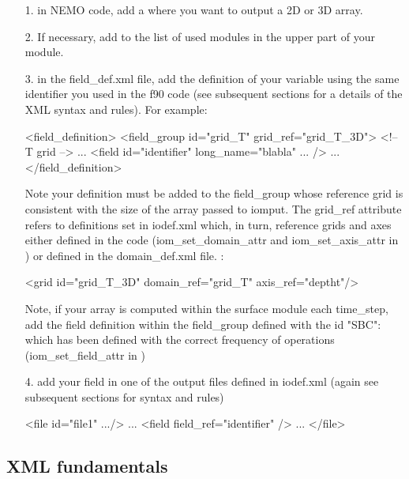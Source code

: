 \documentclass[../main/NEMO_manual]{subfiles}
\begin{document}
\begin{enumerate}
\item[1.]
  in NEMO code, add a  where you want to output a 2D or 3D array.
\item[2.]
  If necessary, add  to the list of used modules in
  the upper part of your module.
\item[3.]
  in the field\_def.xml file, add the definition of your variable using the same identifier you used in the f90 code
  (see subsequent sections for a details of the XML syntax and rules).
  For example:

\begin{xmllines}
<field_definition>
	<field_group id="grid_T" grid_ref="grid_T_3D"> <!-- T grid -->
	...
		<field id="identifier" long_name="blabla" ... />   
		...
</field_definition> 
\end{xmllines}

Note your definition must be added to the field\_group whose reference grid is consistent with the size of
the array passed to iomput.
The grid\_ref attribute refers to definitions set in iodef.xml which, in turn,
reference grids and axes either defined in the code
(iom\_set\_domain\_attr and iom\_set\_axis\_attr in ) or defined in the domain\_def.xml file.
\eg:

\begin{xmllines}
<grid id="grid_T_3D" domain_ref="grid_T" axis_ref="deptht"/>
\end{xmllines}

Note, if your array is computed within the surface module each  time\_step,
add the field definition within the field\_group defined with the id "SBC":
 which has been defined with the correct frequency of operations
(iom\_set\_field\_attr in )
\item[4.]
  add your field in one of the output files defined in iodef.xml
  (again see subsequent sections for syntax and rules)

\begin{xmllines}
<file id="file1" .../>   
...
	<field field_ref="identifier" />   
	...
</file>   
\end{xmllines}

\end{enumerate}

\subsection{XML fundamentals}
\end{document}
